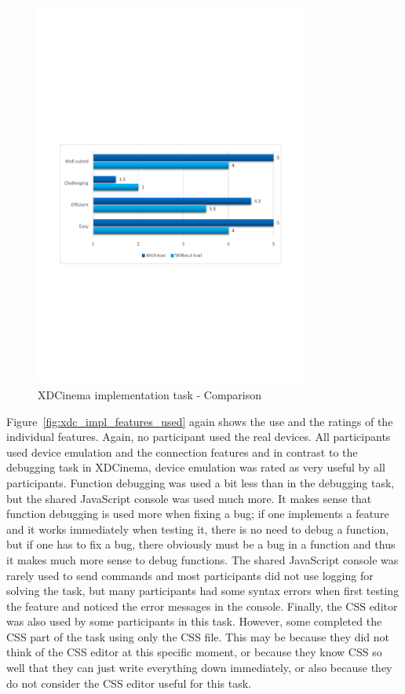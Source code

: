 \begin{figure}[H]
  \centering
    \includegraphics[width=0.8\textwidth]{images/charts/xdc_impl_comparison.pdf}
	\caption[xdc-impl: Comparison]{XDCinema implementation task - Comparison}
	\label{fig:xdc_impl_comparison}
\end{figure}

Figure~\ref{fig:xdc_impl_features_used} again shows the use and the ratings of the individual features. Again, no participant used the real devices. All participants used device emulation and the connection features and in contrast to the debugging task in XDCinema, device emulation was rated as very useful by all participants. Function debugging was used a bit less than in the debugging task, but the shared JavaScript console was used much more. It makes sense that function debugging is used more when fixing a bug; if one implements a feature and it works immediately when testing it, there is no need to debug a function, but if one has to fix a bug, there obviously must be a bug in a function and thus it makes much more sense to debug functions. The shared JavaScript console was rarely used to send commands and most participants did not use logging for solving the task, but many participants had some syntax errors when first testing the feature and noticed the error messages in the console. Finally, the CSS editor was also used by some participants in this task. However, some completed the CSS part of the task using only the CSS file. This may be because they did not think of the CSS editor at this specific moment, or because they know CSS so well that they can just write everything down immediately, or also because they do not consider the CSS editor useful for this task.

